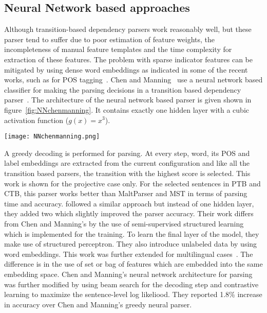 \subsection{Neural Network based approaches}

Although transition-based dependency parsers work reasonably well, but these parser tend to suffer due to poor estimation of feature weights, the incompleteness of manual feature templates and the time complexity for extraction of these features. The problem with sparse indicator features can be mitigated by using dense word embeddings as indicated in some of the recent works, such as for POS tagging~\cite{collobert2011natural}. Chen and Manning~\cite{chen2014fast} use a neural network based classifier for making the parsing decisions in a transition based dependency parser~\cite{Nivre:2004:DDP:1220355.1220365}. The architecture of the neural network based parser is given shown in figure~\ref{fig:NNchenmanning}. It contains exactly one hidden layer with a cubic  activation function ($g(x) = x^3$).

\begin{figure*}[!htb]
    \centering
    \texttt{[image: NNchenmanning.png]}
    \centering
    \caption{Neural Network architecture}
    \label{fig:NNchenmanning}
\end{figure*}

A greedy decoding is performed for parsing. At every step, word, its POS and label embeddings are extracted from the current configuration and like all the transition based parsers, the transition with the highest score is selected. This work is shown for the projective case only. For the selected sentences in PTB and CTB, this parser works better than MaltParser and MST in terms of parsing time and accuracy. 
\cite{weiss2015structured} followed a similar approach but instead of one hidden layer, they added two which slightly improved the parser accuracy. Their work differs from Chen and Manning's by the use of semi-supervised structured learning which is implemented for the training. To learn the final layer of the model, they make use of structured perceptron. They also introduce unlabeled data by using word embeddings. This work was further extended for multilingual cases~\cite{alberti2015improved}. The difference is in the use of set or bag of features which are embedded into the same embedding space. 
Chen and Manning's neural network architecture for parsing was further modified by 
\cite{zhou2015neural} using beam search for the decoding step and contrastive learning to maximize the sentence-level log likeliood. They reported 1.8\% increase in accuracy over Chen and Manning's greedy neural parser.


